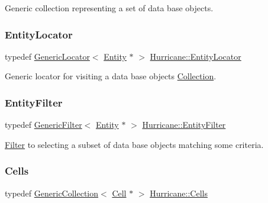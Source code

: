 Generic collection representing a set of data base objects. \mbox{\label{namespaceHurricane_ad3f039057bc40adfd993d83ace24fb83}} 
\subsubsection{\texorpdfstring{Entity\+Locator}{EntityLocator}}
{\footnotesize\ttfamily typedef \mbox{\hyperlink{classHurricane_1_1GenericLocator}{Generic\+Locator}}$<$ \mbox{\hyperlink{classHurricane_1_1Entity}{Entity}} $\ast$ $>$ \mbox{\hyperlink{namespaceHurricane_ad3f039057bc40adfd993d83ace24fb83}{Hurricane\+::\+Entity\+Locator}}}

Generic locator for visiting a data base objects \mbox{\hyperlink{classHurricane_1_1Collection}{Collection}}. \mbox{\label{namespaceHurricane_af0fe741a1ef28dedcb26bf979b1dea5c}} 
\subsubsection{\texorpdfstring{Entity\+Filter}{EntityFilter}}
{\footnotesize\ttfamily typedef \mbox{\hyperlink{classHurricane_1_1GenericFilter}{Generic\+Filter}}$<$ \mbox{\hyperlink{classHurricane_1_1Entity}{Entity}} $\ast$ $>$ \mbox{\hyperlink{namespaceHurricane_af0fe741a1ef28dedcb26bf979b1dea5c}{Hurricane\+::\+Entity\+Filter}}}

\mbox{\hyperlink{classHurricane_1_1Filter}{Filter}} to selecting a subset of data base objects matching some criteria. \mbox{\label{namespaceHurricane_a8b4ab14b26f36f43d83a50294410b44a}} 
\subsubsection{\texorpdfstring{Cells}{Cells}}
{\footnotesize\ttfamily typedef \mbox{\hyperlink{classHurricane_1_1GenericCollection}{Generic\+Collection}}$<$ \mbox{\hyperlink{classHurricane_1_1Cell}{Cell}} $\ast$ $>$ \mbox{\hyperlink{namespaceHurricane_a8b4ab14b26f36f43d83a50294410b44a}{Hurricane\+::\+Cells}}}


